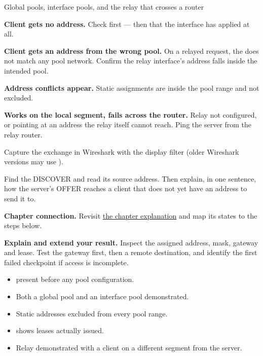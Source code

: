 \begin{labproject}{Global pools, interface pools, and the relay that crosses a router}
\begin{troubleshoot}
\textbf{Client gets no address.} Check  first --- then that the interface has  applied at all.

\textbf{Client gets an address from the wrong pool.} On a relayed request, the  does not match any pool network. Confirm the relay interface's address falls inside the intended pool.

\textbf{Address conflicts appear.} Static assignments are inside the pool range and not excluded.

\textbf{Works on the local segment, fails across the router.} Relay not configured, or pointing at an address the relay itself cannot reach. Ping the server from the relay router.
\end{troubleshoot}

\begin{tryit}
Capture the exchange in Wireshark with the display filter  (older Wireshark versions may use ).

Find the DISCOVER and read its source address. Then explain, in one sentence, how the server's OFFER reaches a client that does not yet have an address to send it to.
\end{tryit}
\end{labproject}

\textbf{Chapter connection.} Revisit \hyperref[ch:dhcp]{the chapter explanation} and map its states to the steps below.


\begin{verification}
\textbf{Explain and extend your result.} Inspect the assigned address, mask, gateway and lease. Test the gateway first, then a remote destination, and identify the first failed checkpoint if access is incomplete.


\begin{itemize}
  \item {} present before any pool configuration.
  \item Both a global pool and an interface pool demonstrated.
  \item Static addresses excluded from every pool range.
  \item {} shows leases actually issued.
  \item Relay demonstrated with a client on a different segment from the server.
\end{itemize}
\end{verification}
